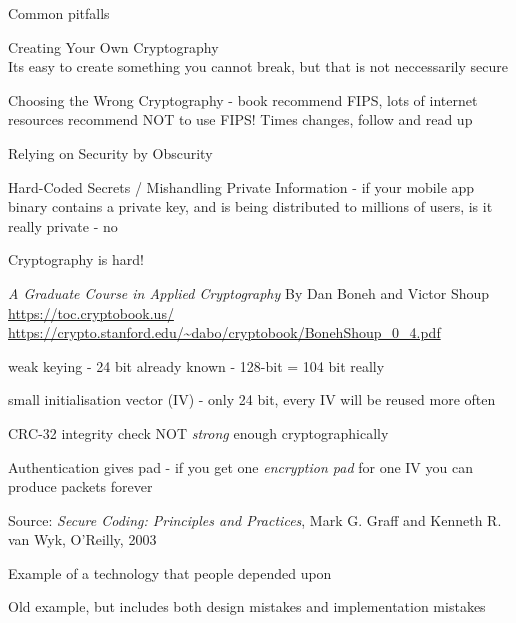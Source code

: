 \documentclass[Screen16to9,17pt]{foils}
\begin{document}

Common pitfalls
\begin{list2}
\item Creating Your Own Cryptography\\
Its easy to create something you cannot break, but that is not neccessarily secure
\item Choosing the Wrong Cryptography - book recommend FIPS, lots of internet resources recommend NOT to use FIPS! Times changes, follow and read up
\item Relying on Security by Obscurity
\item Hard-Coded Secrets / Mishandling Private Information - if your mobile app binary contains a private key, and is being distributed to millions of users, is it really private - no
\end{list2}

Cryptography is hard!
\begin{list1}
\item \emph{A Graduate Course in Applied Cryptography} By Dan Boneh and Victor Shoup\\
 \url{https://toc.cryptobook.us/}\\ \url{https://crypto.stanford.edu/~dabo/cryptobook/BonehShoup_0_4.pdf}
\end{list1}



\begin{list1}
\item weak keying - 24 bit already known - 128-bit = 104 bit really
\item small initialisation vector (IV) - only 24 bit, every IV will be reused more often
\item CRC-32 integrity check NOT \emph{strong} enough cryptographically
\item Authentication gives pad - if you get one \emph{encryption pad} for one IV you can produce packets forever
\end{list1}
Source:
\emph{Secure Coding: Principles and Practices}, Mark G. Graff
and Kenneth R. van Wyk, O'Reilly, 2003

Example of a technology that people depended upon\\

Old example, but includes both design mistakes and implementation mistakes
\end{document}

